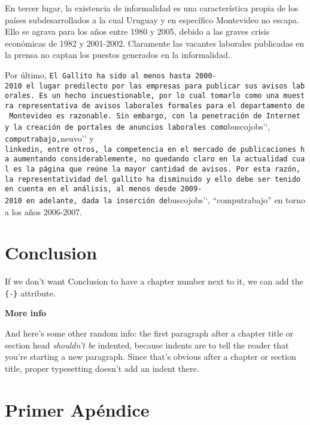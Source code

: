 \documentclass[msc,oneside,a4paper]{udelar} %
\begin{document}
  En tercer lugar, la existencia de informalidad es una característica propia de los países subdesarrollados a la cual Uruguay y en específico Montevideo no escapa. Ello se agrava para los años entre 1980 y 2005, debido a las graves crisis económicas de 1982 y 2001-2002. Claramente las vacantes laborales publicadas en la prensa no captan los puestos generados en la informalidad.
  
  Por último, \texttt{El\ Gallito\textquotesingle{}\textquotesingle{}\ ha\ sido\ al\ menos\ hasta\ 2000-2010\ el\ lugar\ predilecto\ por\ las\ empresas\ para\ publicar\ sus\ avisos\ laborales.\ Es\ un\ hecho\ incuestionable,\ por\ lo\ cual\ tomarlo\ como\ una\ muestra\ representativa\ de\ avisos\ laborales\ formales\ para\ el\ departamento\ de\ Montevideo\ es\ razonable.\ Sin\ embargo,\ con\ la\ penetración\ de\ Internet\ y\ la\ creación\ de\ portales\ de\ anuncios\ laborales\ como}buscojobs'`, \texttt{computrabajo\textquotesingle{}\textquotesingle{},}neuvo'' y \texttt{linkedin\textquotesingle{}\textquotesingle{},\ entre\ otros,\ la\ competencia\ en\ el\ mercado\ de\ publicaciones\ ha\ aumentando\ considerablemente,\ no\ quedando\ claro\ en\ la\ actualidad\ cual\ es\ la\ página\ que\ reúne\ la\ mayor\ cantidad\ de\ avisos.\ Por\ esta\ razón,\ la\ representatividad\ del\ gallito\ ha\ disminuido\ y\ ello\ debe\ ser\ tenido\ en\ cuenta\ en\ el\ análisis,\ al\ menos\ desde\ 2009-2010\ en\ adelante,\ dada\ la\ inserción\ de}buscojobs'`, ``computrabajo'' en torno a los años 2006-2007.
  
  \hypertarget{conclusion}{%
  \chapter*{Conclusion}\label{conclusion}}
  
  If we don't want Conclusion to have a chapter number next to it, we can add the \texttt{\{-\}} attribute.
  
  \textbf{More info}
  
  And here's some other random info: the first paragraph after a chapter title or section head \emph{shouldn't be} indented, because indents are to tell the reader that you're starting a new paragraph. Since that's obvious after a chapter or section title, proper typesetting doesn't add an indent there.
  
  \appendix
  
  \hypertarget{primer-apuxe9ndice}{%
  \chapter{Primer Apéndice}\label{primer-apuxe9ndice}}
  
\end{document}
